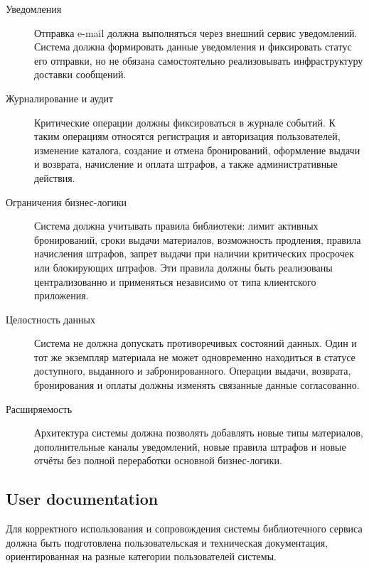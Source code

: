 \documentclass[12pt,a4paper]{article}
\begin{document}
\begin{description}
		\item[Уведомления]
		Отправка e-mail должна выполняться через внешний сервис
		уведомлений. Система должна формировать данные уведомления и фиксировать
		статус его отправки, но не обязана самостоятельно реализовывать инфраструктуру
		доставки сообщений.
		
		\item[Журналирование и аудит]
		Критические операции должны фиксироваться в журнале событий. К таким операциям
		относятся регистрация и авторизация пользователей, изменение каталога,
		создание и отмена бронирований, оформление выдачи и возврата, начисление и
		оплата штрафов, а также административные действия.
		
		\item[Ограничения бизнес-логики]
		Система должна учитывать правила библиотеки: лимит активных бронирований,
		сроки выдачи материалов, возможность продления, правила начисления штрафов,
		запрет выдачи при наличии критических просрочек или блокирующих штрафов.
		Эти правила должны быть реализованы централизованно и применяться независимо
		от типа клиентского приложения.
		
		\item[Целостность данных]
		Система не должна допускать противоречивых состояний данных. Один и тот же
		экземпляр материала не может одновременно находиться в статусе доступного,
		выданного и забронированного. Операции выдачи, возврата, бронирования и оплаты
		должны изменять связанные данные согласованно.
		
		\item[Расширяемость]
		Архитектура системы должна позволять добавлять новые типы материалов,
		дополнительные каналы уведомлений, новые правила штрафов и новые отчёты без
		полной переработки основной бизнес-логики.
	\end{description}
	
	\subsection{User documentation}
	
	Для корректного использования и сопровождения системы библиотечного сервиса должна быть
	подготовлена пользовательская и техническая документация, ориентированная на
	разные категории пользователей системы.
	
\end{document}
